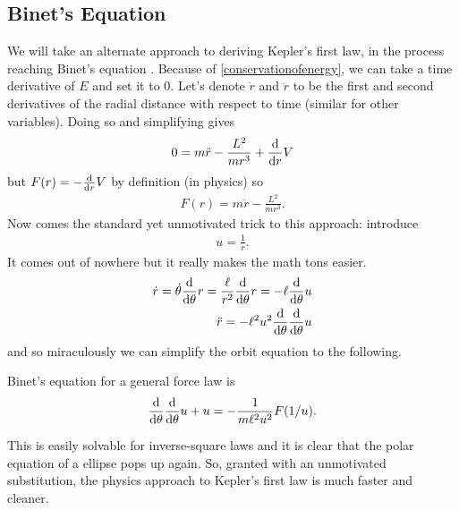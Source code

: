 \subsection{Binet's Equation}
We will take an alternate approach to deriving Kepler's first law, in the process reaching Binet's equation \cite{Tong}. Because of \ref{conservationofenergy}, we can take a time derivative of $E$ and set it to $0$. Let's denote $\dot r$ and $\ddot r$ to be the first and second derivatives of the radial distance with respect to time (similar for other variables). Doing so and simplifying gives
\begin{align}
    0 = m\ddot r - \frac{L^2}{mr^3} + \frac{\mathrm{d}}{\mathrm{d}r}{V} \\
\end{align}
but $F(r) = -\frac{\mathrm{d}}{\mathrm{d}r}{V}$ by definition (in physics) so 
\begin{align}
    F(r) = m\ddot r - \frac{L^2}{mr^3}.
\end{align}
Now comes the standard yet unmotivated trick to this approach: introduce 
\begin{align}
    u = \frac{1}{r}.
\end{align} It comes out of nowhere but it really makes the math tons easier.
\begin{align}
    \dot r = \dot \theta \frac{\mathrm{d}}{\mathrm{d}\theta}{r} = \frac{\ell}{r^2}\frac{\mathrm{d}}{\mathrm{d}\theta}{r} = -\ell \frac{\mathrm{d}}{\mathrm{d}\theta}{u} \\
    \ddot r = -\ell^2 u^2 \frac{\mathrm{d}}{\mathrm{d}\theta}{}\frac{\mathrm{d}}{\mathrm{d}\theta}{u} \\
\end{align}
and so miraculously we can simplify the orbit equation to the following. 
\begin{theorem}
Binet's equation for a general force law is 
\begin{equation}
    \frac{\mathrm{d}}{\mathrm{d}\theta}{}\frac{\mathrm{d}}{\mathrm{d}\theta}{u} + u = -\frac{1}{m\ell^2u^2}F(1/u).
\end{equation}
\end{theorem}
This is easily solvable for inverse-square laws and it is clear that the polar equation of a ellipse pops up again. So, granted with an unmotivated substitution, the physics approach to Kepler's first law is much faster and cleaner. 
